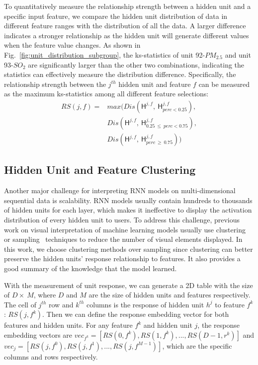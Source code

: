 To quantitatively measure the relationship strength between a hidden unit and a specific input feature, we compare the hidden unit distribution of data in different feature ranges with the distribution of all the data.
A larger difference indicates a stronger relationship as the hidden unit will generate different values when the feature value changes. As shown in Fig.~\ref{fig:unit_distribution_subgroup}, the ks-statistics of unit 92-$PM_{2.5}$ and unit 93-$SO_{2}$ are significantly larger than the other two combinations, indicating the statistics can effectively measure the distribution difference.
Specifically, the relationship strength between the $j^{th}$ hidden unit and feature $f$ can be measured as the maximum ks-statistics among all different feature selections:
\begin{equation}
    \label{equation:qualify_response}
    \begin{split}
    RS(j, f) = & max(Dis(\mathsf{H}^{j, f},~\mathsf{H}_{perc<0.25}^{j, f}), \\ 
    & Dis(\mathsf{H}^{j, f},~\mathsf{H}_{0.25~\leq~perc<0.75}^{j, f}), \\ 
    & Dis(\mathsf{H}^{j, f},~\mathsf{H}_{perc~\geq~0.75}^{j, f}))
    \end{split}
\end{equation}

\subsection{Hidden Unit and Feature Clustering} \label{section:clustering}
Another major challenge for interpreting RNN models on multi-dimensional sequential data is scalability.
RNN models usually contain hundreds to thousands of hidden units for each layer, which makes it ineffective to display the activation distribution of every hidden unit to users.
To address this challenge, previous work on visual interpretation of machine learning models usually use clustering~\cite{ming2017understanding, liu2017towards} or sampling~\cite{pezzotti2018deepeyes} techniques to reduce the number of visual elements displayed.
In this work, we choose clustering methods over sampling since clustering can better preserve the hidden units' response relationship to features. It also provides a good summary of the knowledge that the model learned. 

With the measurement of unit response, we can generate a 2D table with the size of $D \times\ M$, where $D$ and $M$ are the size of hidden units and features respectively. The cell of $j^{th}$ row and $k^{th}$ columns is the response of hidden unit $h^j$ to feature $f^k$: $RS(j,f^k)$. Then we can define the response embedding vector for both features and hidden units. For any feature $f^k$ and hidden unit $j$, the response embedding vectors are $vec_{f^k}= [RS(0, f^k), RS(1, f^k), ..., RS(D-1, r^k)]$ and $vec_{j}= [RS(j, f^0), RS(j, f^1), ..., RS(j, f^{M-1})]$, which are the specific columns and rows respectively. 

